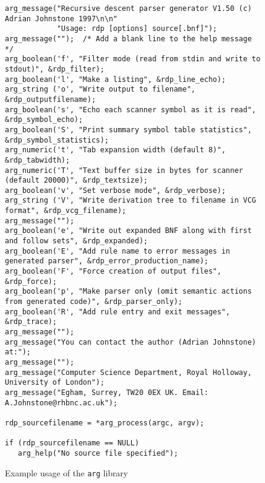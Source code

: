 \begin{figure}
{
\footnotesize
\begin{verbatim}
arg_message("Recursive descent parser generator V1.50 (c) Adrian Johnstone 1997\n\n"
            "Usage: rdp [options] source[.bnf]");
arg_message("");  /* Add a blank line to the help message */
arg_boolean('f', "Filter mode (read from stdin and write to stdout)", &rdp_filter);
arg_boolean('l', "Make a listing", &rdp_line_echo);
arg_string ('o', "Write output to filename", &rdp_outputfilename);
arg_boolean('s', "Echo each scanner symbol as it is read", &rdp_symbol_echo);
arg_boolean('S', "Print summary symbol table statistics", &rdp_symbol_statistics);
arg_numeric('t', "Tab expansion width (default 8)", &rdp_tabwidth);
arg_numeric('T', "Text buffer size in bytes for scanner (default 20000)", &rdp_textsize);
arg_boolean('v', "Set verbose mode", &rdp_verbose);
arg_string ('V', "Write derivation tree to filename in VCG format", &rdp_vcg_filename);
arg_message("");
arg_boolean('e', "Write out expanded BNF along with first and follow sets", &rdp_expanded);
arg_boolean('E', "Add rule name to error messages in generated parser", &rdp_error_production_name);
arg_boolean('F', "Force creation of output files", &rdp_force);
arg_boolean('p', "Make parser only (omit semantic actions from generated code)", &rdp_parser_only);
arg_boolean('R', "Add rule entry and exit messages", &rdp_trace);
arg_message("");
arg_message("You can contact the author (Adrian Johnstone) at:");
arg_message("");
arg_message("Computer Science Department, Royal Holloway, University of London");
arg_message("Egham, Surrey, TW20 0EX UK. Email: A.Johnstone@rhbnc.ac.uk");

rdp_sourcefilename = *arg_process(argc, argv);

if (rdp_sourcefilename == NULL)
   arg_help("No source file specified");
\end{verbatim}
}
\caption{Example usage of the {\tt arg} library}
\label{arg:example:in}
\end{figure}

